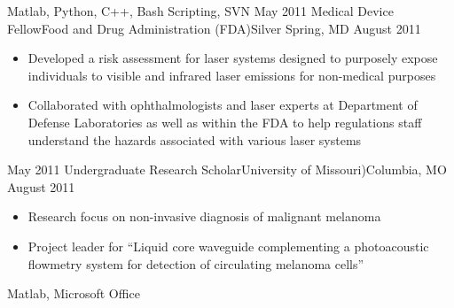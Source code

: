 \begin{experiences}
{\begin{itemize}
                      \end{itemize}
                    }
                    {Matlab, Python, C++, Bash Scripting, SVN}
  \emptySeparator
  \experience
    {May 2011}     {Medical Device Fellow}{Food and Drug Administration (FDA)}{Silver Spring, MD}
    {August 2011}    {
                      \begin{itemize}
                        \item Developed a risk assessment for laser systems designed to purposely expose individuals to visible and infrared laser emissions for non-medical purposes
                        \item Collaborated with ophthalmologists and laser experts at Department of Defense Laboratories as well as within the FDA to help regulations staff understand the hazards associated with various laser systems              
                      \end{itemize}
                    }
                    {}
  \emptySeparator
  \experience
    {May 2011}     {Undergraduate Research Scholar}{University of Missouri)}{Columbia, MO}
    {August 2011}    {
                      \begin{itemize}
                        \item Research focus on non-invasive diagnosis of malignant melanoma
                        \item Project leader for “Liquid core waveguide complementing a photoacoustic flowmetry system for detection of circulating melanoma cells”             
                      \end{itemize}
                    }
                    {Matlab, Microsoft Office}
    
 
\end{experiences}
